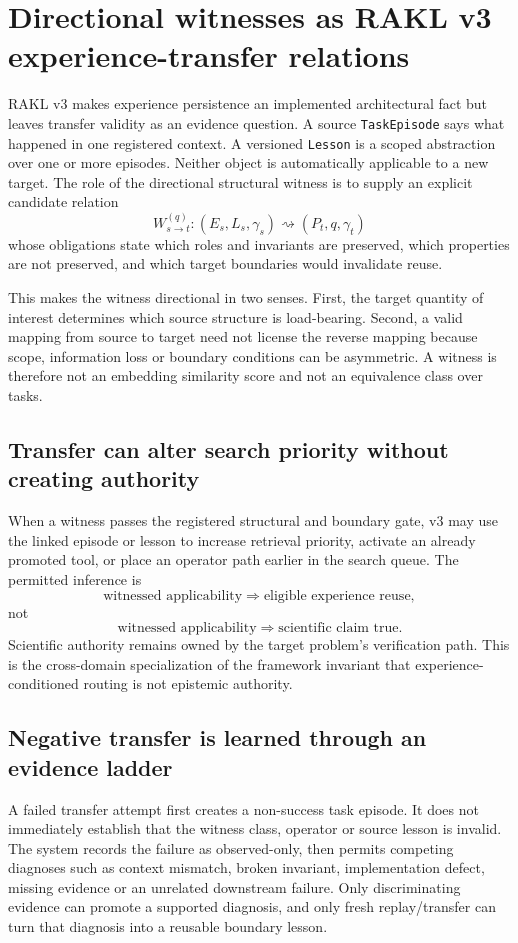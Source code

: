 \section{Directional witnesses as RAKL v3 experience-transfer relations}
\label{sec:v3-transfer}

RAKL v3 makes experience persistence an implemented architectural fact but leaves transfer validity as an evidence question. A source \texttt{TaskEpisode} says what happened in one registered context. A versioned \texttt{Lesson} is a scoped abstraction over one or more episodes. Neither object is automatically applicable to a new target. The role of the directional structural witness is to supply an explicit candidate relation
\[
W_{s\rightarrow t}^{(q)}:
(E_s,L_s,\gamma_s)
\rightsquigarrow
(P_t,q,\gamma_t)
\]
whose obligations state which roles and invariants are preserved, which properties are not preserved, and which target boundaries would invalidate reuse.

This makes the witness directional in two senses. First, the target quantity of interest determines which source structure is load-bearing. Second, a valid mapping from source to target need not license the reverse mapping because scope, information loss or boundary conditions can be asymmetric. A witness is therefore not an embedding similarity score and not an equivalence class over tasks.

\subsection{Transfer can alter search priority without creating authority}
When a witness passes the registered structural and boundary gate, v3 may use the linked episode or lesson to increase retrieval priority, activate an already promoted tool, or place an operator path earlier in the search queue. The permitted inference is
\[
\text{witnessed applicability}
\Rightarrow
\text{eligible experience reuse},
\]
not
\[
\text{witnessed applicability}
\Rightarrow
\text{scientific claim true}.
\]
Scientific authority remains owned by the target problem's verification path. This is the cross-domain specialization of the framework invariant that experience-conditioned routing is not epistemic authority.

\subsection{Negative transfer is learned through an evidence ladder}
A failed transfer attempt first creates a non-success task episode. It does not immediately establish that the witness class, operator or source lesson is invalid. The system records the failure as observed-only, then permits competing diagnoses such as context mismatch, broken invariant, implementation defect, missing evidence or an unrelated downstream failure. Only discriminating evidence can promote a supported diagnosis, and only fresh replay/transfer can turn that diagnosis into a reusable boundary lesson.

